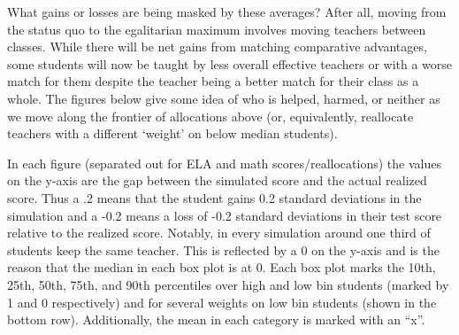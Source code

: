\documentclass[12pt]{article}
\theoremstyle{definition}
\theoremstyle{definition}
\theoremstyle{definition}
\theoremstyle{definition}
\begin{document}
    What gains or losses are being masked by these averages? After all, moving from the status quo to the egalitarian maximum involves moving teachers between classes. While there will be net gains from matching comparative advantages, some students will now be taught by less overall effective teachers or with a worse match for them despite the teacher being a better match for their class as a whole. The figures below give some idea of who is helped, harmed, or neither as we move along the frontier of allocations above (or, equivalently, reallocate teachers with a different ‘weight’ on below median students).
	
	In each figure (separated out for ELA and math scores/reallocations) the values on the y-axis are the gap between the simulated score and the actual realized score. Thus a .2 means that the student gains 0.2 standard deviations in the simulation and a -0.2 means a loss of -0.2 standard deviations in their test score relative to the realized score. Notably, in every simulation around one third of students keep the same teacher. This is reflected by a 0 on the y-axis and is the reason that the median in each box plot is at 0. Each box plot marks the 10th, 25th, 50th, 75th, and 90th percentiles over high and low bin students (marked by 1 and 0 respectively) and for several weights on low bin students (shown in the bottom row). Additionally, the mean in each category is marked with an “x”.
\end{document}
